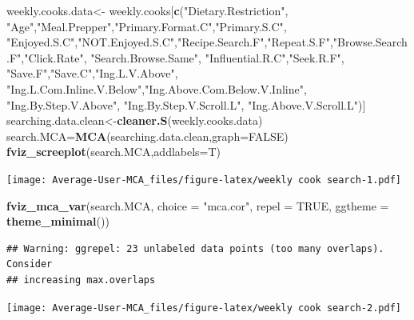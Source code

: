 \documentclass[
]{article}
\newenvironment{Shaded}{\begin{snugshade}}{\end{snugshade}}
\newcommand{\DataTypeTok}[1]{\textcolor[rgb]{0.13,0.29,0.53}{#1}}
\newcommand{\KeywordTok}[1]{\textcolor[rgb]{0.13,0.29,0.53}{\textbf{#1}}}
\newcommand{\NormalTok}[1]{#1}
\newcommand{\OtherTok}[1]{\textcolor[rgb]{0.56,0.35,0.01}{#1}}
\newcommand{\StringTok}[1]{\textcolor[rgb]{0.31,0.60,0.02}{#1}}
\begin{document}
\begin{Shaded}
\begin{Highlighting}[]
\NormalTok{weekly.cooks.data<-}\StringTok{ }\NormalTok{weekly.cooks[}\KeywordTok{c}\NormalTok{(}\StringTok{"Dietary.Restriction"}\NormalTok{, }\StringTok{"Age"}\NormalTok{,}\StringTok{"Meal.Prepper"}\NormalTok{,}\StringTok{"Primary.Format.C"}\NormalTok{,}\StringTok{"Primary.S.C"}\NormalTok{,}
            \StringTok{"Enjoyed.S.C"}\NormalTok{,}\StringTok{"NOT.Enjoyed.S.C"}\NormalTok{,}\StringTok{"Recipe.Search.F"}\NormalTok{,}\StringTok{"Repeat.S.F"}\NormalTok{,}\StringTok{"Browse.Search.F"}\NormalTok{,}\StringTok{"Click.Rate"}\NormalTok{,}
            \StringTok{"Search.Browse.Same"}\NormalTok{, }\StringTok{"Influential.R.C"}\NormalTok{,}\StringTok{"Seek.R.F"}\NormalTok{, }\StringTok{"Save.F"}\NormalTok{,}\StringTok{"Save.C"}\NormalTok{,}\StringTok{"Ing.L.V.Above"}\NormalTok{,}
            \StringTok{"Ing.L.Com.Inline.V.Below"}\NormalTok{,}\StringTok{"Ing.Above.Com.Below.V.Inline"}\NormalTok{,  }\StringTok{"Ing.By.Step.V.Above"}\NormalTok{,  }\StringTok{"Ing.By.Step.V.Scroll.L"}\NormalTok{,}
            \StringTok{"Ing.Above.V.Scroll.L"}\NormalTok{)]}
\NormalTok{searching.data.clean<-}\KeywordTok{cleaner.S}\NormalTok{(weekly.cooks.data)}
\NormalTok{search.MCA=}\KeywordTok{MCA}\NormalTok{(searching.data.clean,}\DataTypeTok{graph=}\OtherTok{FALSE}\NormalTok{)}
\KeywordTok{fviz_screeplot}\NormalTok{(search.MCA,}\DataTypeTok{addlabels=}\NormalTok{T)}
\end{Highlighting}
\end{Shaded}

\texttt{[image: Average-User-MCA\_files/figure-latex/weekly cook search-1.pdf]}

\begin{Shaded}
\begin{Highlighting}[]
\KeywordTok{fviz_mca_var}\NormalTok{(search.MCA, }\DataTypeTok{choice =} \StringTok{"mca.cor"}\NormalTok{, }\DataTypeTok{repel =} \OtherTok{TRUE}\NormalTok{,}
             \DataTypeTok{ggtheme =} \KeywordTok{theme_minimal}\NormalTok{())}
\end{Highlighting}
\end{Shaded}

\begin{verbatim}
## Warning: ggrepel: 23 unlabeled data points (too many overlaps). Consider
## increasing max.overlaps
\end{verbatim}

\texttt{[image: Average-User-MCA\_files/figure-latex/weekly cook search-2.pdf]}
\end{document}
